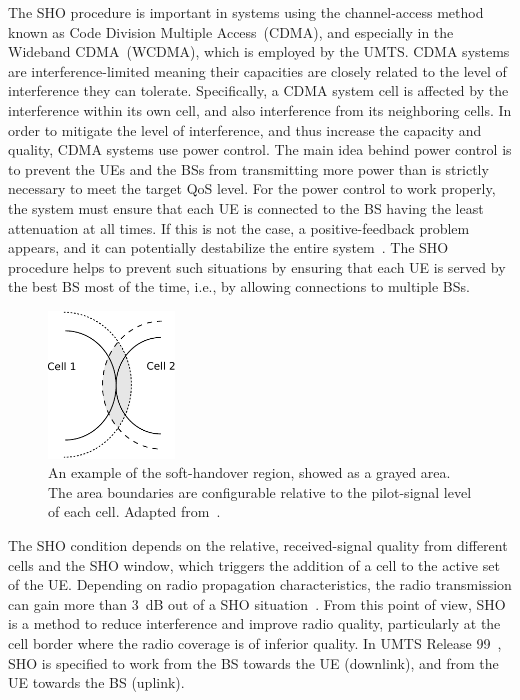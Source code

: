 The SHO procedure is important in systems using the channel-access
method known as Code Division Multiple Access~(CDMA),
and especially in the Wideband CDMA~(WCDMA),
which is employed by the UMTS. CDMA systems are interference-limited
meaning their capacities are closely related to the level of interference
they can tolerate. Specifically, a CDMA system cell is affected by
the interference within its own cell, and also interference from its
neighboring cells. In order to mitigate the level of interference,
and thus increase the capacity and quality, CDMA systems use power
control. The main idea behind power control is to prevent the UEs
and the BSs from transmitting more power than is strictly necessary
to meet the target QoS level. For the power control to work properly,
the system must ensure that each UE is connected to the BS having
the least attenuation at all times. If this is not the case, a positive-feedback
problem appears, and it can potentially destabilize the entire system~\cite{Wong-Soft_handoffs_in_CDMA_mobile_systems:1997}.
The SHO procedure helps to prevent such situations by ensuring that
each UE is served by the best BS most of the time, i.e., by allowing
connections to multiple BSs.

\begin{figure}
\centering

\includegraphics[width=0.3\textwidth]{02-background_and_motivation/img/sho_example}

\caption{An example of the soft-handover region, showed as a grayed area. The
area boundaries are configurable relative to the pilot-signal level
of each cell. Adapted from~\cite{Stuber-Principles_of_mobile_communication:2011}.
\label{fig:02-SHO_example}}
\end{figure}


The SHO condition depends on the relative, received-signal quality
from different cells and the SHO window, which triggers the addition
of a cell to the active set of the UE. Depending on radio propagation
characteristics, the radio transmission can gain more than 3~dB out
of a SHO situation~\cite{WCDMAforUMTS_RadioAccessForThirdGenerationMobileCommunications}.
From this point of view, SHO is a method to reduce interference and
improve radio quality, particularly at the cell border where the radio
coverage is of inferior quality. In UMTS Release 99~\cite{WCDMAforUMTS_RadioAccessForThirdGenerationMobileCommunications},
SHO is specified to work from the BS towards the UE (downlink), and
from the UE towards the BS (uplink).

